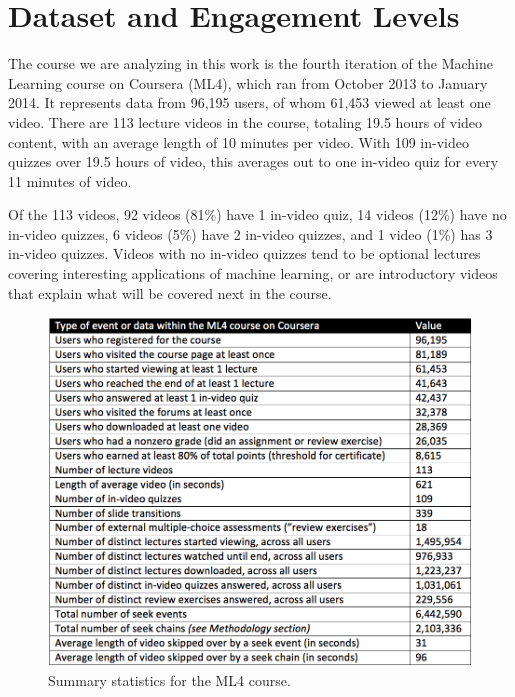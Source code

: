 \documentclass{sigchi}
\begin{document}
\section{Dataset and Engagement Levels}

The course we are analyzing in this work is the fourth iteration of the Machine Learning course on Coursera (ML4), which ran from October 2013 to January 2014. It represents data from 96,195 users, of whom 61,453 viewed at least one video. There are 113 lecture videos in the course, totaling 19.5 hours of video content, with an average length of 10 minutes per video. With 109  in-video quizzes over 19.5 hours of video, this averages out to one in-video quiz for every 11 minutes of video.

Of the 113 videos, 92 videos (81\%) have 1 in-video quiz, 14 videos (12\%) have no in-video quizzes, 6 videos (5\%) have 2 in-video quizzes, and 1 video (1\%) has 3 in-video quizzes. Videos with no in-video quizzes tend to be optional lectures covering interesting applications of machine learning, or are introductory videos that explain what will be covered next in the course. %

\begin{figure}
\includegraphics[width=1.0\columnwidth]{summary-statistics}
\caption{Summary statistics for the ML4 course.}
\label{fig:summary-statistics}
\end{figure}
\end{document}
